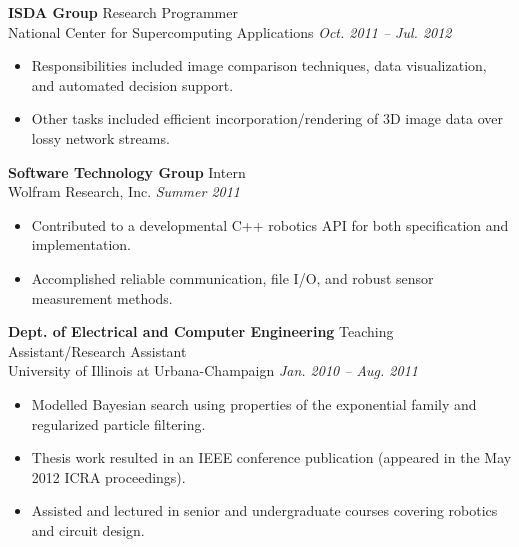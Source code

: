 \documentclass{article}
\begin{document}
{\begin{multicols}{2}
    \textbf{ISDA Group} \hfill Research Programmer\\  
    National Center for Supercomputing Applications \hfill \textsl{Oct. 2011 -- Jul. 2012} \\
    \vspace{ -2 mm}
    \begin{itemize}
        \item Responsibilities included image comparison techniques, data visualization, and automated decision support. 
        \item Other tasks included efficient incorporation/rendering of 3D image data over lossy network streams.  
    \end{itemize}\vspace{-2mm}
   
    \textbf{Software Technology Group} \hfill Intern\\  
    Wolfram Research, Inc. \hfill \textsl{Summer 2011} \\
    \vspace{ -2 mm}
    \begin{itemize}
        \item Contributed to a developmental C++ robotics API for both specification and implementation.
	 \item Accomplished reliable communication, file I/O, and robust sensor measurement methods. 
    \end{itemize}\vspace{-2mm}

    \textbf{Dept. of Electrical and Computer Engineering} \hfill Teaching Assistant/Research Assistant \\  
    University of Illinois at Urbana-Champaign \hfill \textsl{Jan. 2010 -- Aug. 2011} \\
    \vspace{ -2 mm}
    \begin{itemize}
        \item Modelled Bayesian search using properties of the exponential family and regularized particle filtering.
	 \item Thesis work resulted in an IEEE conference publication (appeared in the May 2012 ICRA proceedings).  
        \item Assisted and lectured in senior and undergraduate courses covering robotics and circuit design.
    \end{itemize}\vspace{-2mm}


\end{multicols}}
\end{document}
